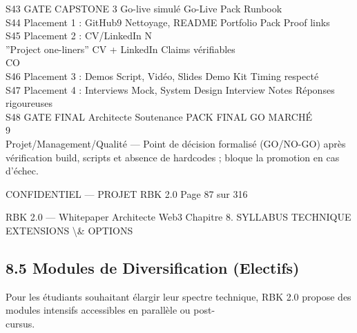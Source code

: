 S43 GATE CAPSTONE 3                      Go-live simulé                   Go-Live Pack             Runbook\\
S44 Placement 1 : GitHub9                Nettoyage, README                Portfolio Pack           Proof links\\
S45 Placement 2 : CV/LinkedIn            N\\
”Project one-liners”             CV + LinkedIn            Claims vérifiables\\
CO\\
S46 Placement 3 : Demos                  Script, Vidéo, Slides            Demo Kit                 Timing respecté\\
S47 Placement 4 : Interviews             Mock, System Design              Interview Notes          Réponses rigoureuses\\
S48 GATE FINAL Architecte                Soutenance                       PACK FINAL               GO MARCHÉ\\
\vspace{0.5em}
\vspace{0.5em}
\vspace{0.5em}
\vspace{0.5em}
9\\
Projet/Management/Qualité — Point de décision formalisé (GO/NO-GO) après vérification build, scripts et absence de hardcodes ; bloque la promotion en cas d’échec.\\
\vspace{0.5em}
\vspace{0.5em}
\begin{confidential}CONFIDENTIEL — PROJET RBK 2.0                                            Page 87 sur 316\end{confidential}
RBK 2.0 — Whitepaper Architecte Web3                                                                  Chapitre 8. SYLLABUS TECHNIQUE\\
\vspace{0.5em}
\vspace{0.5em}
\vspace{0.5em}
EXTENSIONS \textbackslash{}& OPTIONS\\
\vspace{0.5em}
\subsection{8.5 Modules de Diversification (Electifs)}
Pour les étudiants souhaitant élargir leur spectre technique, RBK 2.0 propose des modules intensifs accessibles en parallèle ou post-\\
cursus.\\
\vspace{0.5em}
\vspace{0.5em}
